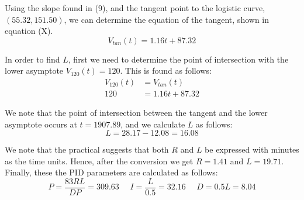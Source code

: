\documentclass{article}
\begin{document}
Using the slope found in (9), and the tangent point to the logistic curve, $(55.32, 151.50)$, we can determine the equation of the tangent, shown in equation (X).
\begin{equation}
V_{tan}(t) = 1.16t + 87.32
\end{equation}

In order to find $L$, first we need to determine the point of intersection with the lower asymptote $V_{120}(t) = 120$. This is found as follows:
\begin{align}
V_{120}(t) &= V_{tan}(t)\\
120 &= 1.16t + 87.32
\end{align}

We note that the point of intersection between the tangent and the lower asymptote occurs at $t=1907.89$, and we calculate $L$ as follows:
\begin{equation}
	L = 28.17 - 12.08 = 16.08
\end{equation}

We note that the practical suggests that both $R$ and $L$ be expressed with minutes as the time units. Hence, after the conversion we get $R = 1.41$ and $L = 19.71$. Finally, these the PID parameters are calculated as follows:
\begin{equation}
P = \frac{83RL}{DP} = 309.63 \ \ \ \ \ \ I = \frac{L}{0.5} = 32.16 \ \ \ \ \ \ D = 0.5L = 8.04
\end{equation}
\end{document}
